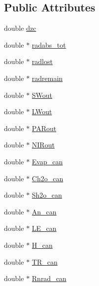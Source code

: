 \subsection*{Public Attributes}
\begin{DoxyCompactItemize}
\item 
double \hyperlink{class_vertical_canopy_class_a6861d45d6133adfad5ee45f4af49e155}{dzc}
\item 
double $\ast$ \hyperlink{class_vertical_canopy_class_afac14e8f4160208d93368334163ec7c5}{radabs\+\_\+tot}
\item 
double $\ast$ \hyperlink{class_vertical_canopy_class_af3b23fe3b0be64094cd7d9206547d5a0}{radlost}
\item 
double $\ast$ \hyperlink{class_vertical_canopy_class_a3cca2dde555c3d1fdcc7580b725536d9}{radremain}
\item 
double $\ast$ \hyperlink{class_vertical_canopy_class_a65cb0768b0e48d83abbd5953b3ebd651}{S\+Wout}
\item 
double $\ast$ \hyperlink{class_vertical_canopy_class_abd580df7ccd734e3e4b41bfacda5b875}{L\+Wout}
\item 
double $\ast$ \hyperlink{class_vertical_canopy_class_a56001b7c44ae27b60035b61efe10fa9f}{P\+A\+Rout}
\item 
double $\ast$ \hyperlink{class_vertical_canopy_class_a352d45e4def4b52c47908b4914087199}{N\+I\+Rout}
\item 
double $\ast$ \hyperlink{class_vertical_canopy_class_a0f44e06ae4f85a6a64b783306fea827b}{Evap\+\_\+can}
\item 
double $\ast$ \hyperlink{class_vertical_canopy_class_a2473cb763ccc000bceccb4680c64a43d}{Ch2o\+\_\+can}
\item 
double $\ast$ \hyperlink{class_vertical_canopy_class_a882b7a9fcf5eea5b818494afbf5ed08f}{Sh2o\+\_\+can}
\item 
double $\ast$ \hyperlink{class_vertical_canopy_class_a889a667c751dd0ccc5b7d60079b7ef20}{An\+\_\+can}
\item 
double $\ast$ \hyperlink{class_vertical_canopy_class_af4d41bc4763ada7bb1b6ee98cd14ef69}{L\+E\+\_\+can}
\item 
double $\ast$ \hyperlink{class_vertical_canopy_class_a00c27ff6da992c6602c742feb81bdd48}{H\+\_\+can}
\item 
double $\ast$ \hyperlink{class_vertical_canopy_class_a552db8da6587705ccf36b03d3dd0d205}{T\+R\+\_\+can}
\item 
double $\ast$ \hyperlink{class_vertical_canopy_class_a02808dc9486deda2d6907637482c1858}{Rnrad\+\_\+can}

\end{DoxyCompactItemize}
